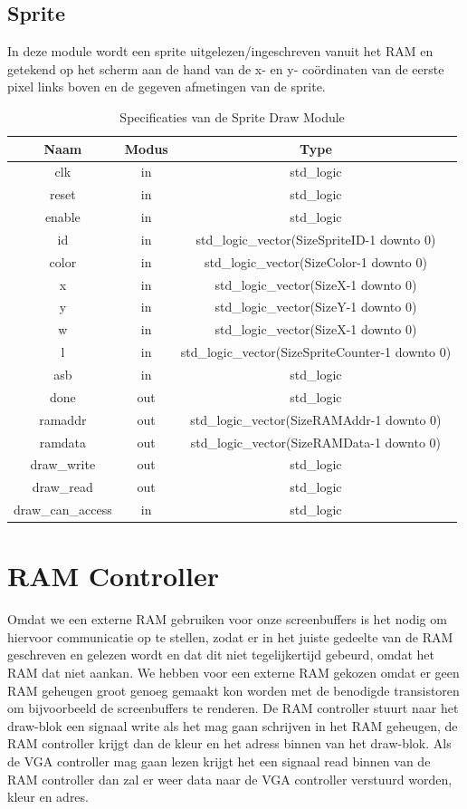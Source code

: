 \documentclass{scrreprt} %
\begin{document}
\subsection {Sprite}
In deze module wordt een sprite uitgelezen/ingeschreven vanuit het RAM en getekend op het scherm aan de hand van de x- en y- coördinaten van de eerste pixel links boven en de gegeven afmetingen van de sprite.
\begin{table}[H]
\centering
\caption{Specificaties van de Sprite Draw Module}
\label{tab:spec-sprite-draw}
\begin{tabular}{c c c}
	\hline\hline
 	Naam & Modus & Type\\
 	\hline	
	clk & in & std\_logic \\
	reset & in & std\_logic \\
	enable& in & std\_logic \\
	id & in & std\_logic\_vector(SizeSpriteID-1 downto 0) \\
	color & in & std\_logic\_vector(SizeColor-1 downto 0) \\
	x & in & std\_logic\_vector(SizeX-1 downto 0) \\
	y & in & std\_logic\_vector(SizeY-1 downto 0) \\
	w & in & std\_logic\_vector(SizeX-1 downto 0) \\
	l & in & std\_logic\_vector(SizeSpriteCounter-1 downto 0) \\
	asb & in & std\_logic \\
	done & out & std\_logic \\
	ramaddr &out & std\_logic\_vector(SizeRAMAddr-1 downto 0) \\
	ramdata &out & std\_logic\_vector(SizeRAMData-1 downto 0) \\
	draw\_write &out & std\_logic \\
	draw\_read&out & std\_logic \\
	draw\_can\_access & in & std\_logic \\
  	\hline
\end{tabular}
\end{table}

\section{RAM Controller}
Omdat we een externe RAM gebruiken voor onze screenbuffers is het nodig om hiervoor communicatie op te stellen, zodat er in het juiste gedeelte van de RAM geschreven en gelezen wordt en dat dit niet tegelijkertijd gebeurd, omdat het RAM dat niet aankan. We hebben voor een externe RAM gekozen omdat er geen RAM geheugen groot genoeg gemaakt kon worden met de benodigde transistoren om bijvoorbeeld de screenbuffers te renderen. De RAM controller stuurt naar het draw-blok een signaal write als het mag gaan schrijven in het RAM geheugen, de RAM controller krijgt dan de kleur en het adress binnen van het draw-blok. Als de VGA controller mag gaan lezen krijgt het een signaal read binnen van de RAM controller dan zal er weer data naar de VGA controller verstuurd worden, kleur en adres.
\end{document}
